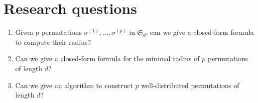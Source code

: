 \section{Research questions}
\begin{enumerate}
	\item
		Given $p$ permutations
	$\sigma^{(1)}, \dots, \sigma^{(p)}$
	in
	$\mathfrak{S}_d$,
	can we give a closed-form formula to compute their radius?
	\item
		Can we give a closed-form formula for the minimal radius of $p$ permutations of length $d$?
	\item
		Can we give an algorithm to construct $p$ well-distributed permutations of length $d$?
\end{enumerate}

